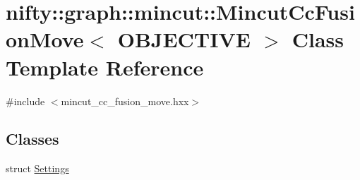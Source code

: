 \hypertarget{classnifty_1_1graph_1_1mincut_1_1MincutCcFusionMove}{}\section{nifty\+:\+:graph\+:\+:mincut\+:\+:Mincut\+Cc\+Fusion\+Move$<$ O\+B\+J\+E\+C\+T\+I\+V\+E $>$ Class Template Reference}
\label{classnifty_1_1graph_1_1mincut_1_1MincutCcFusionMove}


{\ttfamily \#include $<$mincut\+\_\+cc\+\_\+fusion\+\_\+move.\+hxx$>$}

\subsection*{Classes}
\begin{DoxyCompactItemize}
\item 
struct \hyperlink{structnifty_1_1graph_1_1mincut_1_1MincutCcFusionMove_1_1Settings}{Settings}
\end{DoxyCompactItemize}
